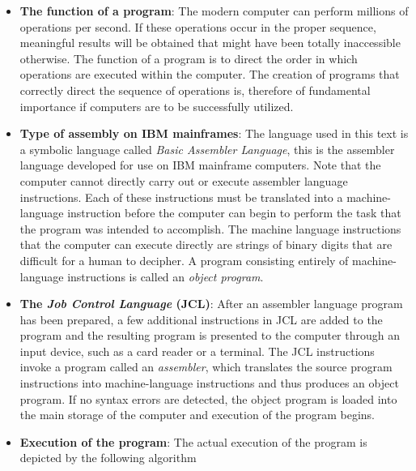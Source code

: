 \documentclass{report}
\begin{document}
            \begin{itemize}
                \item \textbf{The function of a program}: The modern computer can perform millions of operations per second. If these operations occur in the proper sequence, meaningful results will be obtained that might have been totally inaccessible otherwise. The function of a program is to direct the order in which operations are executed within the computer.
                    \bigbreak \noindent 
                    The creation of programs that correctly direct the sequence of operations is, therefore of fundamental importance if computers are to be successfully utilized.
                \item \textbf{Type of assembly on IBM mainframes}: The language used in this text is a symbolic language called \textit{Basic Assembler Language}, this is the assembler language developed for use on IBM mainframe computers.
                    \bigbreak \noindent 
                    Note that the computer cannot directly carry out or execute assembler language instructions. Each of these instructions must be translated into a machine-language instruction before the computer can begin to perform the task that the program was intended to accomplish.
                    \bigbreak \noindent 
                    The machine language instructions that the computer can execute directly are strings of binary digits that are difficult for a human to decipher. A program consisting entirely of machine-language instructions is called an \textit{object program}.
                    \bigbreak \noindent 
                \item \textbf{The \textit{Job Control Language} (JCL)}: After an assembler language program has been prepared, a few additional instructions in JCL are added to the program and the resulting program is presented to the computer through an input device, such as a card reader or a terminal. The JCL instructions invoke a program called an \textit{assembler}, which translates the source program instructions into machine-language instructions and thus produces an object program.
                    \bigbreak \noindent 
                    If no syntax errors are detected, the object program is loaded into the main storage of the computer and execution of the program begins.
                \item \textbf{Execution of the program}: The actual execution of the program is depicted by the following algorithm
                    \begin{enumerate}

\end{enumerate}
\end{itemize}
\end{document}
